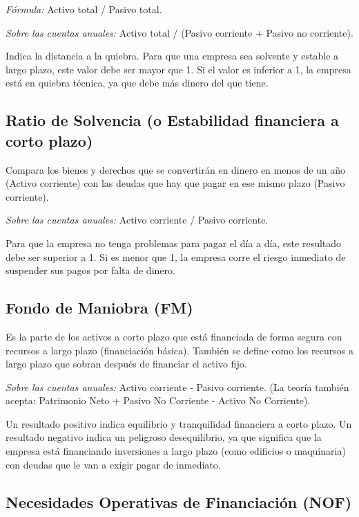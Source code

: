 \documentclass[12pt]{book} %
\begin{document}
\emph{Fórmula:} Activo total / Pasivo total.

\emph{Sobre las cuentas anuales:} Activo total / (Pasivo corriente +
Pasivo no corriente).

Indica la distancia a la quiebra. Para que una empresa sea solvente y
estable a largo plazo, este valor debe ser mayor que 1. Si el valor es
inferior a 1, la empresa está en quiebra técnica, ya que debe más dinero
del que tiene.

\hypertarget{ratio-de-solvencia-o-estabilidad-financiera-a-corto-plazo}{%
\subsection{Ratio de Solvencia (o Estabilidad financiera a corto
plazo)}\label{ratio-de-solvencia-o-estabilidad-financiera-a-corto-plazo}}

Compara los bienes y derechos que se convertirán en dinero en menos de
un año (Activo corriente) con las deudas que hay que pagar en ese mismo
plazo (Pasivo corriente).

\emph{Sobre las cuentas anuales:} Activo corriente / Pasivo corriente.

Para que la empresa no tenga problemas para pagar el día a día, este
resultado debe ser superior a 1. Si es menor que 1, la empresa corre el
riesgo inmediato de suspender sus pagos por falta de dinero.

\hypertarget{fondo-de-maniobra-fm}{%
\subsection{Fondo de Maniobra (FM)}\label{fondo-de-maniobra-fm}}

Es la parte de los activos a corto plazo que está financiada de forma
segura con recursos a largo plazo (financiación básica). También se
define como los recursos a largo plazo que sobran después de financiar
el activo fijo.

\emph{Sobre las cuentas anuales:} Activo corriente - Pasivo corriente.
(La teoría también acepta: Patrimonio Neto + Pasivo No Corriente -
Activo No Corriente).

Un resultado positivo indica equilibrio y tranquilidad financiera a
corto plazo. Un resultado negativo indica un peligroso desequilibrio, ya
que significa que la empresa está financiando inversiones a largo plazo
(como edificios o maquinaria) con deudas que le van a exigir pagar de
inmediato.

\hypertarget{necesidades-operativas-de-financiaciuxf3n-nof}{%
\subsection{Necesidades Operativas de Financiación
(NOF)}\label{necesidades-operativas-de-financiaciuxf3n-nof}}
\end{document}
